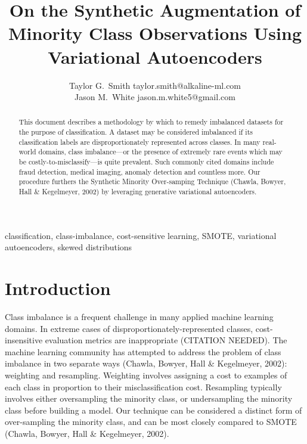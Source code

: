 \documentclass[twoside,11pt]{article}
\begin{document}
\title{On the Synthetic Augmentation of Minority Class Observations Using Variational Autoencoders}

\author{\name Taylor G.\ Smith \email taylor.smith@alkaline-ml.com \\
       \AND
       \name Jason M.\ White \email jason.m.white5@gmail.com}


\maketitle

\begin{abstract}%
This document describes a methodology by which to remedy imbalanced datasets for the purpose of classification. A dataset may be considered imbalanced if its classification labels are disproportionately represented across classes. In many real-world domains, class imbalance---or the presence of extremely rare events which may be costly-to-misclassify---is quite prevalent. Such commonly cited domains include fraud detection, medical imaging, anomaly detection and countless more.  Our procedure furthers the Synthetic Minority Over-samping Technique (Chawla, Bowyer, Hall \& Kegelmeyer, 2002) by leveraging generative variational autoencoders.
\end{abstract}

\begin{keywords}
  classification, class-imbalance, cost-sensitive learning, SMOTE, variational autoencoders, skewed distributions
\end{keywords}

\section{Introduction}

Class imbalance is a frequent challenge in many applied machine learning domains. In extreme cases of disproportionately-represented classes, cost-insensitive evaluation metrics are inappropriate (CITATION NEEDED). The machine learning community has attempted to address the problem of class imbalance in two separate ways (Chawla, Bowyer, Hall \& Kegelmeyer, 2002): weighting and resampling. Weighting involves assigning a cost to examples of each class in proportion to their misclassification cost. Resampling typically involves either oversampling the minority class, or undersampling the minority class before building a model. Our technique can be considered a distinct form of over-sampling the minority class, and can be most closely compared to SMOTE (Chawla, Bowyer, Hall \& Kegelmeyer, 2002).
\end{document}
